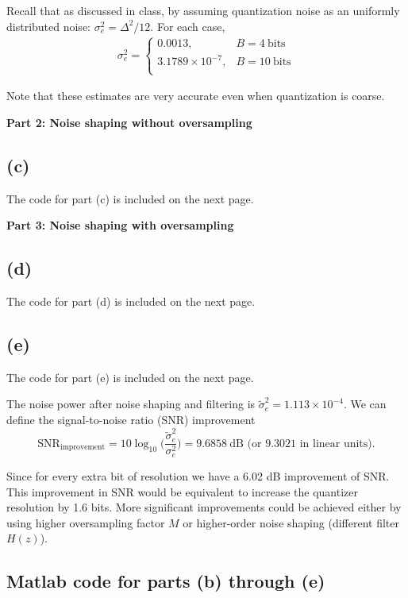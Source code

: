 \documentclass{article}
\begin{document}
Recall that as discussed in class, by assuming quantization noise as an uniformly distributed noise: $\sigma_e^2 = \Delta^2/12$. For each case,
\begin{align*}
\sigma_e^2 = \begin{cases}
0.0013, & B = 4~\text{bits} \\
3.1789\times 10^{-7}, & B = 10~\text{bits} \\
\end{cases}
\end{align*}

Note that these estimates are very accurate even when quantization is coarse. 

\noindent\textbf{Part 2: Noise shaping without oversampling}
\subsection{(c)}

The code for part (c) is included on the next page.

\noindent\textbf{Part 3: Noise shaping with oversampling}
\subsection{(d)}

The code for part (d) is included on the next page.

\subsection{(e)}

The code for part (e) is included on the next page.

The noise power after noise shaping and filtering is $\tilde{\sigma}_e^2 = 1.113\times 10^{-4}$. We can define the signal-to-noise ratio (SNR) improvement 
\begin{equation}
\text{SNR}_{\text{improvement}} = 10\log_{10}\Big(\frac{\tilde{\sigma}_e^2}{\sigma_e^2}\Big) = 9.6858~\text{dB (or 9.3021 in linear units)}.
\end{equation}

Since for every extra bit of resolution we have a 6.02 dB improvement of SNR. This improvement in SNR would be equivalent to increase the quantizer resolution by 1.6 bits. More significant improvements could be achieved either by using higher oversampling factor $M$ or higher-order noise shaping (different filter $H(z)$).
\subsection{Matlab code for parts (b) through (e)}

\end{document}
